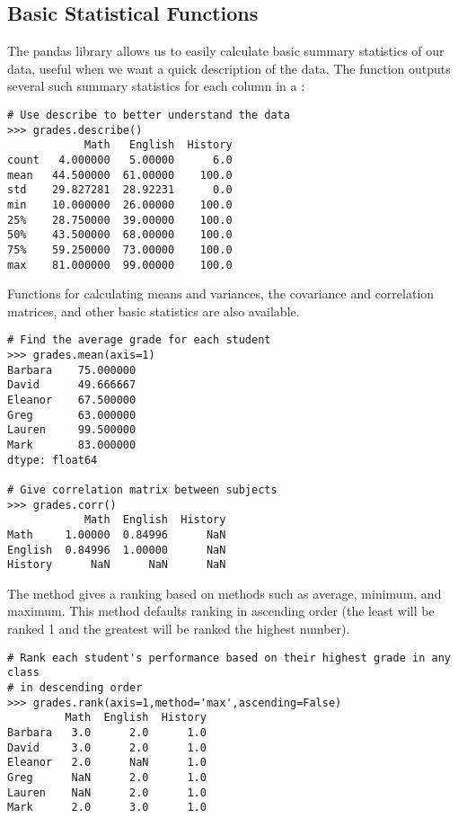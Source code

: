 
\subsection*{Basic Statistical Functions}

The pandas library allows us to easily calculate basic summary statistics of our data,
useful when we want a quick description of the data.
The  function
outputs several such summary statistics for each column in a :
\begin{lstlisting}
# Use describe to better understand the data
>>> grades.describe()
            Math   English  History
count   4.000000   5.00000      6.0
mean   44.500000  61.00000    100.0
std    29.827281  28.92231      0.0
min    10.000000  26.00000    100.0
25%    28.750000  39.00000    100.0
50%    43.500000  68.00000    100.0
75%    59.250000  73.00000    100.0
max    81.000000  99.00000    100.0
\end{lstlisting}

Functions for calculating means and variances, the covariance and correlation matrices, and other
basic statistics are also available.

\begin{lstlisting}
# Find the average grade for each student
>>> grades.mean(axis=1)
Barbara    75.000000
David      49.666667
Eleanor    67.500000
Greg       63.000000
Lauren     99.500000
Mark       83.000000
dtype: float64

# Give correlation matrix between subjects
>>> grades.corr()
            Math  English  History
Math     1.00000  0.84996      NaN
English  0.84996  1.00000      NaN
History      NaN      NaN      NaN
\end{lstlisting}

The method  gives a ranking based on methods such as average, minimum, and maximum.
This method defaults ranking in ascending order (the least will be ranked 1 and the greatest will be ranked the highest number).

\begin{lstlisting}
# Rank each student's performance based on their highest grade in any class 
# in descending order
>>> grades.rank(axis=1,method='max',ascending=False)
         Math  English  History
Barbara   3.0      2.0      1.0
David     3.0      2.0      1.0
Eleanor   2.0      NaN      1.0
Greg      NaN      2.0      1.0
Lauren    NaN      2.0      1.0
Mark      2.0      3.0      1.0
\end{lstlisting}

